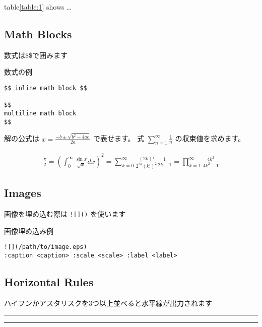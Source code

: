 \documentclass[a4j, titlepage]{jarticle}
\begin{document}
table\ref{table:1} shows \ldots{}

\subsection{Math Blocks}

数式は\$\$で囲みます

\begin{itembox}[c]{数式の例}
\begin{verbatim}
$$ inline math block $$

$$
multiline math block
$$
\end{verbatim}
\end{itembox}

解の公式は $ x = \frac{-b\pm\sqrt{b^2-4ac}}{2a} $ で表せます。
式 $ \sum_{n = 1}^{\infty} \frac{1}{n} $ の収束値を求めます。

\begin{eqnarray*}
\frac{\pi}{2}
= \left( \int_{0}^{\infty} \frac{\sin x}{\sqrt{x}} dx \right)^2 
= \sum_{k=0}^{\infty} \frac{(2k)!}{2^{2k}(k!)^2} \frac{1}{2k+1} 
= \prod_{k=1}^{\infty} \frac{4k^2}{4k^2 - 1}
\end{eqnarray*}

\subsection{Images}

画像を埋め込む際は {\tt ![]()} を使います

\begin{itembox}[c]{画像埋め込み例}
\begin{verbatim}
![](/path/to/image.eps)
:caption <caption> :scale <scale> :label <label>
\end{verbatim}
\end{itembox}

\subsection{Horizontal Rules}

ハイフンかアスタリスクを3つ以上並べると水平線が出力されます

\begin{center}
\rule{3in}{0.4pt}
\end{center}

\begin{center}
\rule{3in}{0.4pt}
\end{center}
\end{document}
